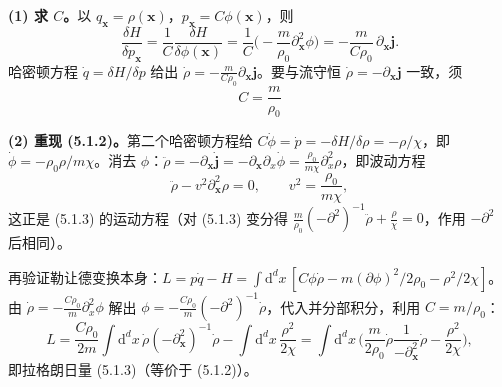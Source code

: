 \textbf{(1) 求 $C$。}以 $q_{\pmb{x}}=\rho(\pmb{x})$，$p_{\pmb{x}}=C\phi(\pmb{x})$，则
\begin{equation*}
\frac{\delta H}{\delta p_{\pmb{x}}}=\frac1C\frac{\delta H}{\delta\phi(\pmb{x})}
=\frac1C\Big(-\frac{m}{\rho_0}\partial_{\pmb{x}}^{2}\phi\Big)
=-\frac{m}{C\rho_0}\,\partial_{\pmb{x}}\pmb{j}.
\end{equation*}
哈密顿方程 $\dot q=\delta H/\delta p$ 给出 $\dot{\rho}=-\frac{m}{C\rho_0}\partial_{\pmb{x}}\pmb{j}$。要与流守恒 $\dot{\rho}=-\partial_{\pmb{x}}\pmb{j}$ 一致，须
\begin{equation*}
\boxed{\;C=\frac{m}{\rho_0}\;}
\end{equation*}

\textbf{(2) 重现 (5.1.2)。}第二个哈密顿方程给 $C\dot\phi=\dot p=-\delta H/\delta\rho=-\rho/\chi$，即 $\dot\phi=-\rho_0\rho/m\chi$。消去 $\phi$：$\ddot\rho=-\partial_{\pmb{x}}\dot{\pmb{j}}=-\partial_{\pmb{x}}\partial_x\dot\phi=\frac{\rho_0}{m\chi}\partial_x^{2}\rho$，即波动方程
\begin{equation*}
\ddot{\rho}-v^{2}\partial_{\pmb{x}}^{2}\rho=0,\qquad v^{2}=\frac{\rho_0}{m\chi},
\end{equation*}
这正是 (5.1.3) 的运动方程（对 (5.1.3) 变分得 $\frac{m}{\rho_0}(-\partial^{2})^{-1}\ddot\rho+\frac{\rho}{\chi}=0$，作用 $-\partial^{2}$ 后相同）。

再验证勒让德变换本身：$L=p\dot q-H=\int\mathrm{d}^dx\,[C\phi\dot\rho-m(\partial\phi)^{2}/2\rho_0-\rho^{2}/2\chi]$。由 $\dot\rho=-\frac{C\rho_0}{m}\partial_x^{2}\phi$ 解出 $\phi=-\frac{C\rho_0}{m}(-\partial^{2})^{-1}\dot\rho$，代入并分部积分，利用 $C=m/\rho_0$：
\begin{equation*}
L=\frac{C\rho_0}{2m}\int\mathrm{d}^dx\,\dot\rho(-\partial_{\pmb{x}}^{2})^{-1}\dot\rho-\int\mathrm{d}^dx\,\frac{\rho^{2}}{2\chi}
=\int\mathrm{d}^dx\,\Big(\frac{m}{2\rho_0}\dot\rho\frac{1}{-\partial_{\pmb{x}}^{2}}\dot\rho-\frac{\rho^{2}}{2\chi}\Big),
\end{equation*}
即拉格朗日量 (5.1.3)（等价于 (5.1.2)）。

